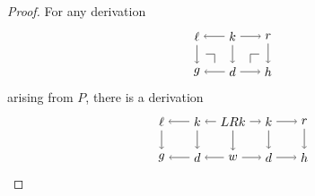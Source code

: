 \documentclass{amsart}
\theoremstyle{remark}
\theoremstyle{definition}
\begin{document}
\begin{proof}
  For any derivation
  \[
  \begin{tikzpicture}
    \node (1t) at (0,1) {$ \ell $};
    \node (2t) at (1,1) {$ k $};
    \node (3t) at (2,1) {$ r $};
    \node (1b) at (0,0) {$ g $};
    \node (2b) at (1,0) {$ d $};
    \node (3b) at (2,0) {$ h $};
    \draw [->] (2t) to node [] {\scriptsize{$  $}} (1t);
    \draw [->] (2t) to node [] {\scriptsize{$  $}} (3t);
    \draw [->] (2b) to node [] {\scriptsize{$  $}} (1b);
    \draw [->] (2b) to node [] {\scriptsize{$  $}} (3b);
    \draw [->] (1t) to node [] {\scriptsize{$  $}} (1b);
    \draw [->] (2t) to node [] {\scriptsize{$  $}} (2b);
    \draw [->] (3t) to node [] {\scriptsize{$  $}} (3b);
     \begin{scope}[shift={(0,0)}]
      \draw [-] (0.25,0.5) to node [] {} (0.5,0.5);
      \draw [-] (0.5,0.5) to node [] {} (0.5,0.25);
    \end{scope}
    \begin{scope}[shift={(1.5,0)}]
      \draw [-] (0,0.25) to (0,0.5);
      \draw [-] (0,0.5) to node [] {} (0.25,0.5);
    \end{scope}
  \end{tikzpicture}
  \]
  arising from $ P $, there is a derivation
  \[
  \begin{tikzpicture}
    \node (01) at (0,1) {$ \ell $};
    \node (11) at (1,1) {$ k $};
    \node (21) at (2,1) {$ LRk $};
    \node (31) at (3,1) {$ k $};
    \node (41) at (4,1) {$ r $};
    \node (00) at (0,0) {$ g $};
    \node (10) at (1,0) {$ d $};
    \node (20) at (2,0) {$ w $};
    \node (30) at (3,0) {$ d $};
    \node (40) at (4,0) {$ h $};
    \draw [->] (11) to node [] {\scriptsize{$  $}} (01);
    \draw [->] (21) to node [] {\scriptsize{$  $}} (11);
    \draw [->] (21) to node [] {\scriptsize{$  $}} (31);
    \draw [->] (31) to node [] {\scriptsize{$  $}} (41);
    \draw [->] (10) to node [] {\scriptsize{$  $}} (00);
    \draw [->] (20) to node [] {\scriptsize{$  $}} (10);
    \draw [->] (20) to node [] {\scriptsize{$  $}} (30);
    \draw [->] (30) to node [] {\scriptsize{$  $}} (40);
    \draw [->] (01) to node [] {\scriptsize{$  $}} (00);
    \draw [->] (11) to node [] {\scriptsize{$  $}} (10);
    \draw [->] (21) to node [] {\scriptsize{$  $}} (20);
    \draw [->] (31) to node [] {\scriptsize{$  $}} (30);
    \draw [->] (41) to node [] {\scriptsize{$  $}} (40);
    \begin{scope}[shift={(0,0)}]

\end{scope}
\end{tikzpicture}\]
\end{proof}
\end{document}
